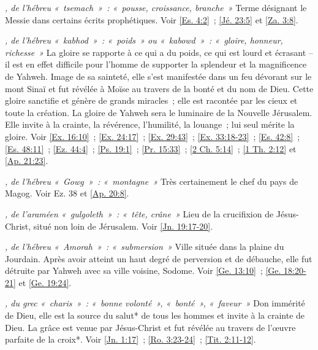 \begin{multicols}{2}
\textit{, de l'hébreu «~tsemach~»~: «~pousse, croissance, branche~»}\newline
Terme désignant le Messie dans certains écrits prophétiques. Voir \vref{Es. 4:2}~; \vref{Jé. 23:5} et \vref{Za. 3:8}.

\textit{, de l'hébreu «~kabhod~»~: «~poids~» ou «~kabowd~»~: «~gloire, honneur, richesse~»}\newline
La gloire se rapporte à ce qui a du poids, ce qui est lourd et écrasant – il est en effet difficile pour l'homme de supporter la splendeur et la magnificence de Yahweh. Image de sa sainteté, elle s'est manifestée dans un feu dévorant sur le mont Sinaï et fut révélée à Moïse au travers de la bonté et du nom de Dieu. Cette gloire sanctifie et génère de grands miracles~; elle est racontée par les cieux et toute la création. La gloire de Yahweh sera le luminaire de la Nouvelle Jérusalem. Elle invite à la crainte, la révérence, l'humilité, la louange~; lui seul mérite la gloire. Voir \vref{Ex. 16:10}~; \vref{Ex. 24:17}~; \vref{Ex. 29:43}~; \vref{Ex. 33:18-23}~; \vref{Es. 42:8}~; \vref{Es. 48:11}~; \vref{Ez. 44:4}~; \vref{Ps. 19:1}~; \vref{Pr. 15:33}~; \vref{2 Ch. 5:14}~; \vref{1 Th. 2:12} et \vref{Ap. 21:23}.

\textit{, de l'hébreu «~Gowg~»~: «~montagne~»}\newline
Très certainement le chef du pays de Magog. Voir Ez. 38 et \vref{Ap. 20:8}.

\textit{, de l'araméen «~gulgoleth~»~: «~tête, crâne~»}\newline
Lieu de la crucifixion de Jésus-Christ, situé non loin de Jérusalem. Voir \vref{Jn. 19:17-20}.

\textit{, de l'hébreu «~Amorah~»~: «~submersion~»}\newline
Ville située dans la plaine du Jourdain. Après avoir atteint un haut degré de perversion et de débauche, elle fut détruite par Yahweh avec sa ville voisine, Sodome. Voir \vref{Ge. 13:10}~; \vref{Ge. 18:20-21} et \vref{Ge. 19:24}.

\textit{, du grec «~charis~»~: «~bonne volonté~», «~bonté~», «~faveur~»}\newline
Don immérité de Dieu, elle est la source du salut* de tous les hommes et invite à la crainte de Dieu. La grâce est venue par Jésus-Christ et fut révélée au travers de l'œuvre parfaite de la croix*. Voir \vref{Jn. 1:17}~; \vref{Ro. 3:23-24}~; \vref{Tit. 2:11-12}.


\end{multicols}
